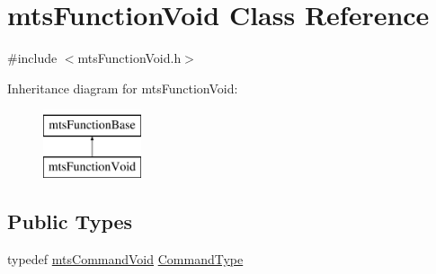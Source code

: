 \hypertarget{classmts_function_void}{\section{mts\-Function\-Void Class Reference}
\label{classmts_function_void}
}


{\ttfamily \#include $<$mts\-Function\-Void.\-h$>$}

Inheritance diagram for mts\-Function\-Void\-:\begin{figure}[H]
\begin{center}
\leavevmode
\includegraphics[height=2.000000cm]{da/d2b/classmts_function_void}
\end{center}
\end{figure}
\subsection*{Public Types}
\begin{DoxyCompactItemize}
\item 
typedef \hyperlink{classmts_command_void}{mts\-Command\-Void} \hyperlink{classmts_function_void_a76cc1c4742429e7cac7e4b73412f4cc9}{Command\-Type}
\end{DoxyCompactItemize}
